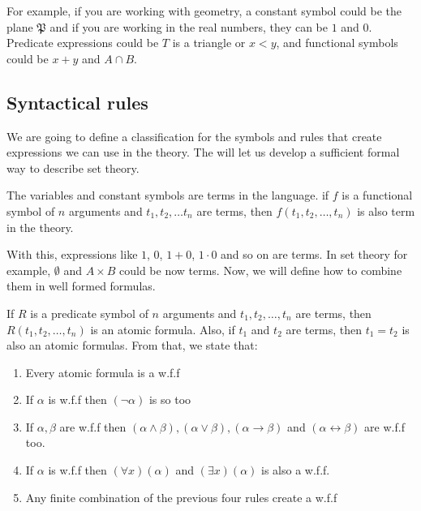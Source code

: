 \documentclass{tufte-handout}
\begin{document}
For example, if you are working with geometry, a constant symbol could be the plane $\mathfrak{P}$ and if you are working in the real numbers, they can be $1$ and $0$. Predicate expressions could be $T$ is a triangle or $x < y$, and functional symbols could be $x + y$ and $A \cap B$.\\

\subsection{Syntactical rules}
We are going to define a classification for the symbols and rules that create expressions we can use in the theory. The will let us develop a sufficient formal way to describe set theory.

\begin{definition}[Terms]
	The variables and constant symbols are terms in the language. if $f$ is a functional symbol of $n$ arguments and $t_1, t_2, \dots t_n$ are terms, then $f(t_1, t_2, \dots, t_n)$ is also term in the theory.
\end{definition}

With this, expressions like $1$, $0$, $1 + 0$, $1 \cdot 0$ and so on are terms. In set theory for example, $\emptyset$ and $A \times B$ could be now terms. Now, we will define how to combine them in well formed formulas.

\begin{definition}
	If $R$ is a predicate symbol of $n$ arguments and $t_1, t_2, \dots, t_n$ are terms, then $R(t_1, t_2, \dots, t_n)$ is an atomic formula. Also, if $t_1$ and $t_2$ are terms, then $t_1 = t_2$ is also an atomic formulas. From that, we state that:
	\begin{enumerate}
		\item Every atomic formula is a w.f.f
		\item If $\alpha$ is w.f.f then $(\neg \alpha)$ is so too
		\item If $\alpha, \beta$ are w.f.f then $(\alpha \wedge \beta), (\alpha \vee \beta), (\alpha \rightarrow \beta)$ and $(\alpha \leftrightarrow \beta)$ are w.f.f too.
		\item If $\alpha$ is w.f.f then $(\forall x)(\alpha)$ and $(\exists x)(\alpha)$ is also a w.f.f.
		\item Any finite combination of the previous four rules create a w.f.f
	\end{enumerate} 
\end{definition}
\end{document}
